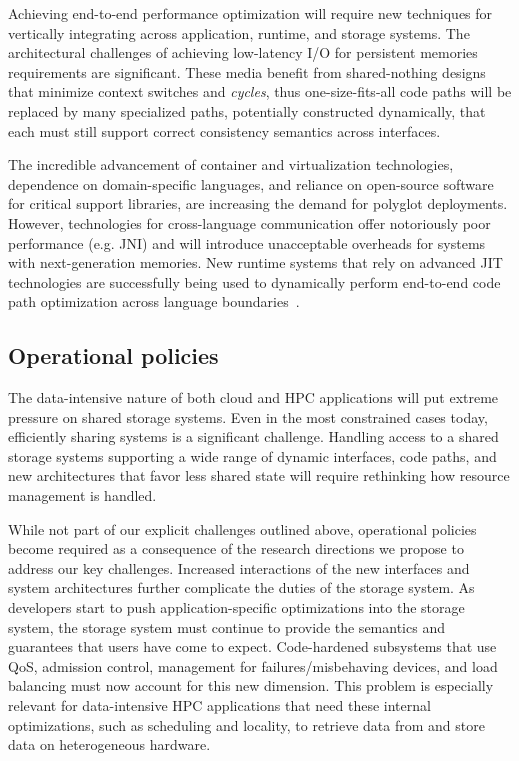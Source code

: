 \documentclass{sig-alternate}
\begin{document}
Achieving end-to-end performance optimization will require new techniques for
vertically integrating across application, runtime, and storage systems. The
architectural challenges of achieving low-latency I/O for persistent memories
requirements are significant. These media benefit from shared-nothing designs
that minimize context switches and \emph{cycles}, thus one-size-fits-all code
paths will be replaced by many specialized paths, potentially constructed
dynamically, that each must still support correct consistency semantics across
interfaces.

The incredible advancement of container and virtualization technologies,
dependence on domain-specific languages, and reliance on open-source software
for critical support libraries, are increasing the demand for polyglot
deployments. However, technologies for cross-language communication offer
notoriously poor performance (e.g. JNI) and will introduce unacceptable
overheads for systems with next-generation memories. New runtime systems that
rely on advanced JIT technologies are successfully being used to dynamically
perform end-to-end code path optimization across language
boundaries~\cite{wurt,friedrich:ecoop16}.

\subsection{Operational policies}

The data-intensive nature of both cloud and HPC applications will put extreme
pressure on shared storage systems. Even in the most constrained cases today,
efficiently sharing systems is a significant challenge. Handling access to a
shared storage systems supporting a wide range of dynamic interfaces, code
paths, and new architectures that favor less shared state will require
rethinking how resource management is handled.

While not part of our explicit challenges outlined above, operational policies
become required as a consequence of the research directions we propose to
address our key challenges.  Increased interactions of the new interfaces and
system architectures further complicate the duties of the storage system. As
developers start to push application-specific optimizations into the storage
system, the storage system must continue to provide the semantics and
guarantees that users have come to expect. Code-hardened subsystems that use
QoS, admission control, management for failures/misbehaving devices, and load
balancing must now account for this new dimension.  This problem is especially
relevant for data-intensive HPC applications that need these internal
optimizations, such as scheduling and locality, to retrieve data from and store
data on heterogeneous hardware.
\end{document}
